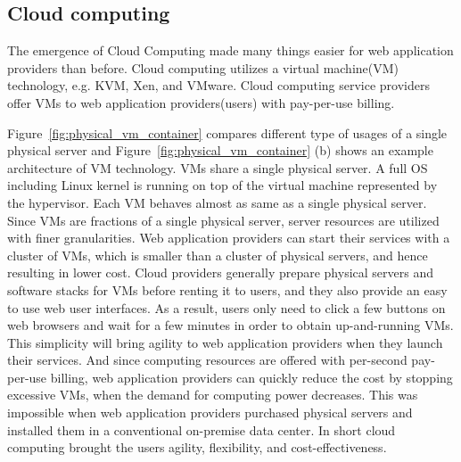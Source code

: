 \subsection{Cloud computing}

The emergence of Cloud Computing made many things easier for web application providers than before.
Cloud computing utilizes a virtual machine(VM) technology, e.g. KVM, Xen, and VMware.
Cloud computing service providers offer VMs to web application providers(users) with pay-per-use billing.

Figure~\ref{fig:physical_vm_container} compares different type of usages of a single physical server and Figure~\ref{fig:physical_vm_container} (b) shows an example architecture of VM technology.
VMs share a single physical server.
A full OS including Linux kernel is running on top of the virtual machine represented by the hypervisor.
Each VM behaves almost as same as a single physical server.
Since VMs are fractions of a single physical server, server resources are utilized with finer granularities.
Web application providers can start their services with a cluster of VMs, which is smaller than a cluster of physical servers, and hence resulting in lower cost.
Cloud providers generally prepare physical servers and software stacks for VMs before renting it to users, and they also provide an easy to use web user interfaces.
As a result, users only need to click a few buttons on web browsers and wait for a few minutes in order to obtain up-and-running VMs.
This simplicity will bring agility to web application providers when they launch their services.
And since computing resources are offered with per-second pay-per-use billing, web application providers can quickly reduce the cost by stopping excessive VMs, when the demand for computing power decreases.
This was impossible when web application providers purchased physical servers and installed them in a conventional on-premise data center.
In short cloud computing brought the users agility, flexibility, and cost-effectiveness.

